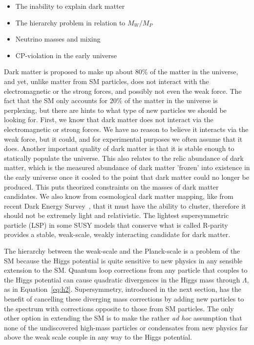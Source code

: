 \begin{itemize}
\item The inability to explain dark matter \cite{BERTONE2005279}
\item The hierarchy problem in relation to $M_W/M_P$
\item Neutrino masses and mixing \cite{1367-2630-16-4-045018}
\item CP-violation in the early universe \cite{Sakharov:1967dj}
 \end{itemize}
Dark matter is proposed to make up about $80\%$ of the matter in the universe, and yet, unlike matter from SM particles, does not interact with the electromagnetic or the strong forces, and possibly not even the weak force.  The fact that the SM only accounts for $20\%$ of the matter in the universe is perplexing, but there are hints to what type of new particles we should be looking for.  First, we know that dark matter does not interact via the electromagnetic or strong forces.  We have no reason to believe it interacts via the weak force, but it could, and for experimental purposes we often assume that it does.  Another important quality of dark matter is that it is stable enough to statically populate the universe.  This also relates to the relic abundance of dark matter, which is the measured abundance of dark matter 'frozen' into existence in the early universe once it cooled to the point that dark matter could no longer be produced.  This puts theorized constraints on the masses of dark matter candidates.  We also know from cosmological dark matter mapping, like from recent Dark Energy Survey~\cite{surveydm}, that it must have the ability to cluster, therefore it should not be extremely light and relativistic.  The lightest supersymmetric particle (LSP) in some SUSY models that conserve what is called R-parity provides a stable, weak-scale, weakly interacting candidate for dark matter. 

The hierarchy between the weak-scale and the Planck-scale is a problem of the SM because the Higgs potential is quite sensitive to new physics in any sensible extension to the SM.  Quantum loop corrections from any particle that couples to the Higgs potential can cause quadratic divergences in the Higgs mass through $\Lambda$, as in Equation~\ref{eq:h2}.  Supersymmetry, introduced in the next section, has the benefit of cancelling these diverging mass corrections by adding new particles to the spectrum with corrections opposite to those from SM particles.  The only other option in extending the SM is to make the rather \textit{ad hoc} assumption that none of the undiscovered high-mass particles or condensates from new physics far above the weak scale couple in any way to the Higgs potential.  


